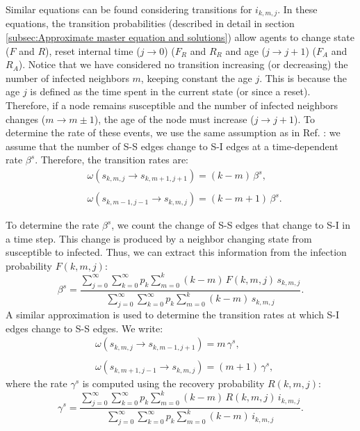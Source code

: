 Similar equations can be found considering transitions for $i_{k,m,j}$. In these equations, the transition probabilities (described in detail in section \ref{subsec:Approximate master equation and solutions}) allow agents to change state ($F$ and $R$), reset internal time ($j \to 0$) ($F_R$ and $R_R$ and age ($j \to j + 1$) ($F_A$ and $R_A$). Notice that we have considered no transition increasing (or decreasing) the number of infected neighbors $m$, keeping constant the age $j$. This is because the age $j$ is defined as the time spent in the current state (or since a reset). Therefore, if a node remains susceptible and the number of infected neighbors changes ($m \to m \pm 1$), the age of the node must increase ($j \to j + 1$). To determine the rate of these events, we use the same assumption as in Ref. \cite{gleeson-2013}: we assume that the number of S-S edges change to S-I edges at a time-dependent rate $\beta^s$. Therefore, the transition rates are:
    \begin{align} \label{rate_beta_s}
    &  \omega (s_{k,m,j} \to s_{k,m+1,j+1}) = (k - m) \, \beta^s, \nonumber \\
    \\
    & \omega (s_{k,m-1,j-1} \to s_{k,m,j}) = (k - m + 1)\, \beta^s . \nonumber 
    \end{align}
    
To determine the rate $\beta^s$, we count the change of S-S edges that change to S-I in a time step. This change is produced by a neighbor changing state from susceptible to infected. Thus, we can extract this information from the infection probability $F (k,m,j) $:
\begin{equation}
        \label{beta_s}
        \beta^s = \frac{\sum_{j=0}^{\infty} \sum_{k=0}^{\infty} p_k \sum_{m = 0}^{k} (k - m)\, F (k,m,j) \, s_{k,m,j}}{\sum_{j=0}^{\infty} \sum_{k=0}^{\infty} p_k \sum_{m = 0}^{k} (k - m) \, s_{k,m,j}}.
\end{equation}
A similar approximation is used to determine the transition rates at which S-I edges change to S-S edges. We write:
\begin{align} \label{rate_gamma_s}
    &  \omega (s_{k,m,j} \to s_{k,m-1,j+1}) = m\, \gamma^{s}, \nonumber \\
    \\
    & \omega (s_{k,m+1,j-1} \to s_{k,m,j}) = (m + 1)\, \gamma^{s} , \nonumber
\end{align}
where the rate $\gamma^s$ is computed using the recovery probability $R (k,m,j)$:
\begin{equation}
        \label{gamma_s}
        \gamma^s = \frac{\sum_{j=0}^{\infty} \sum_{k=0}^{\infty} p_k \sum_{m = 0}^{k} (k - m)\, R (k,m,j)\, i_{k,m,j}}{\sum_{j=0}^{\infty} \sum_{k=0}^{\infty} p_k \sum_{m = 0}^{k} (k - m)\,  i_{k,m,j}}.
\end{equation}
    
